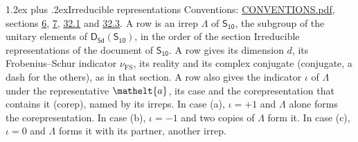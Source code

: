 \documentclass[10pt,a4paper]{article}
\makeatletter
\renewcommand\section{\@startsection{section}{1}{\z@}{-3ex plus -1ex minus -.2ex}%
  {1.2ex plus .2ex}{\normalfont\large\sffamily\bfseries\color{parttitle}}}
\numberwithin{equation}{section}
\newcommand{\eltfont}[1]{{\let\sigma\eltsigma\mathelt{#1}}}
\newcommand{\grp}[1]{\mathsf{#1}}
\newcommand{\elt}[1]{\eltfont{#1}}
\newcommand{\fsind}{\nu_{\mathrm{FS}}}
\makeatother
\begin{document}
\section{Irreducible representations}\label{s:irreps}
Conventions: \href{../../CONVENTIONS.pdf}{CONVENTIONS.pdf}, sections \href{../../../rotation/CONVENTIONS.pdf\#conv.6}{6}, \href{../../../rotation/CONVENTIONS.pdf\#conv.7}{7}, \href{../../CONVENTIONS.pdf\#conv.32.1}{32.1} and \href{../../CONVENTIONS.pdf\#conv.32.3}{32.3}.
\leavevmode\label{n:irrep.Delta}A row is an irrep $\Lambda$ of $\grp{S_{10}}$, the subgroup of the unitary elements of $\grp{D_{5d}}(\grp{S_{10}})$, in the order of the section Irreducible representations of the document of \href{../../../rotation/data/pdf/S10.pdf}{$\grp{S_{10}}$}. \label{n:index.dimension}\label{n:index.frobenius}\label{n:head.irrep}\label{n:head.reality}\label{n:head.conjugate}A row gives its dimension $d$, its Frobenius--Schur indicator $\fsind$, its reality and its complex conjugate (conjugate, a dash for the others), as in that section. \label{n:head.case.corep}\label{n:head.corep}A row also gives the indicator $\iota$ of $\Lambda$ under the representative $\elt{a}$, its case and the corepresentation that contains it (corep), named by its irreps. In case (a), $\iota = +1$ and $\Lambda$ alone forms the corepresentation. In case (b), $\iota = -1$ and two copies of $\Lambda$ form it. In case (c), $\iota = 0$ and $\Lambda$ forms it with its partner, another irrep.
\setlength{\emergencystretch}{2em}\par\setlength{\emergencystretch}{0pt}
\end{document}
